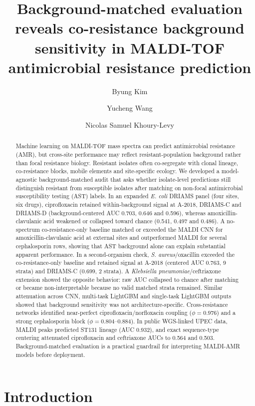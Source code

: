 \documentclass[11pt]{article}
\title{\bfseries Background-matched evaluation reveals co-resistance background sensitivity in MALDI-TOF antimicrobial resistance prediction}
\author[1]{Byung Kim}
\author[2]{Yucheng Wang}
\author[3]{Nicolas Samuel Khoury-Levy}
\affil[1]{United States Air Force Academy, Colorado Springs, CO, USA}
\affil[2]{University of Wisconsin--Madison, Madison, WI, USA}
\affil[3]{Cornell University, Ithaca, NY, USA}
\date{}
\begin{document}
\maketitle

\begin{abstract}
Machine learning on MALDI-TOF mass spectra can predict antimicrobial resistance (AMR), but cross-site performance may reflect resistant-population background rather than focal resistance biology. Resistant isolates often co-segregate with clonal lineage, co-resistance blocks, mobile elements and site-specific ecology. We developed a model-agnostic background-matched audit that asks whether isolate-level predictions still distinguish resistant from susceptible isolates after matching on non-focal antimicrobial susceptibility testing (AST) labels. In an expanded \textit{E. coli} DRIAMS panel (four sites, six drugs), ciprofloxacin retained within-background signal at A-2018, DRIAMS-C and DRIAMS-D (background-centered AUC 0.703, 0.646 and 0.596), whereas amoxicillin-clavulanic acid weakened or collapsed toward chance (0.541, 0.497 and 0.486). A no-spectrum co-resistance-only baseline matched or exceeded the MALDI CNN for amoxicillin-clavulanic acid at external sites and outperformed MALDI for several cephalosporin rows, showing that AST background alone can explain substantial apparent performance. In a second-organism check, \textit{S. aureus}/oxacillin exceeded the co-resistance-only baseline and retained signal at A-2018 (centered AUC 0.763, 9 strata) and DRIAMS-C (0.699, 2 strata). A \textit{Klebsiella pneumoniae}/ceftriaxone extension showed the opposite behavior: raw AUC collapsed to chance after matching or became non-interpretable because no valid matched strata remained. Similar attenuation across CNN, multi-task LightGBM and single-task LightGBM outputs showed that background sensitivity was not architecture-specific. Cross-resistance networks identified near-perfect ciprofloxacin/norfloxacin coupling ($\phi=0.976$) and a strong cephalosporin block ($\phi=0.804$--0.884). In public WGS-linked UPEC data, MALDI peaks predicted ST131 lineage (AUC 0.932), and exact sequence-type centering attenuated ciprofloxacin and ceftriaxone AUCs to 0.564 and 0.503. Background-matched evaluation is a practical guardrail for interpreting MALDI-AMR models before deployment.
\end{abstract}

\section*{Introduction}
\end{document}
